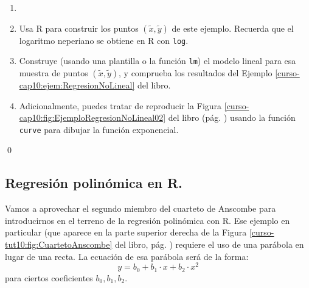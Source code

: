 \documentclass[10pt,a4paper]{article}\usepackage[]{graphicx}\usepackage[]{color}
\begin{document}
\begin{ejercicio}
\label{tut10:ejercicio09}
\begin{enumerate}
  \item[]
  \item Usa R para construir los puntos $(\tilde x, \tilde y)$ de este ejemplo. Recuerda que el logaritmo neperiano se obtiene en R con  {\tt log}.
  \item Construye (usando una plantilla o la función {\tt lm}) el modelo lineal para esa muestra de puntos $(\tilde x, \tilde y)$, y comprueba los resultados del Ejemplo \ref{curso-cap10:ejem:RegresionNoLineal} del libro.
  \item Adicionalmente, puedes tratar de reproducir la Figura \ref{curso-cap10:fig:EjemploRegresionNoLineal02} del libro (pág. \pageref{cap10:fig:EjemploRegresionNoLineal02}) usando la función {\tt curve} para dibujar la función exponencial.
\end{enumerate}
\qed
\end{ejercicio}


\subsection*{Regresión polinómica en R.}
\label{tut10:subsec:regresionPolinomicaR}

Vamos a aprovechar el segundo miembro del cuarteto de Anscombe para introducirnos en el terreno de la regresión polinómica con R. Ese ejemplo en particular (que aparece en la parte superior derecha de la Figura \ref{curso-tut10:fig:CuartetoAnscombe} del libro, pág. \pageref{curso-tut10:fig:CuartetoAnscombe}) requiere el uso de una parábola en lugar de una recta. La ecuación de esa parábola será de la forma:
\[y=b_0+b_1\cdot x+b_2\cdot x^2\]
para ciertos coeficientes $b_0, b_1, b_2$.
\end{document}
